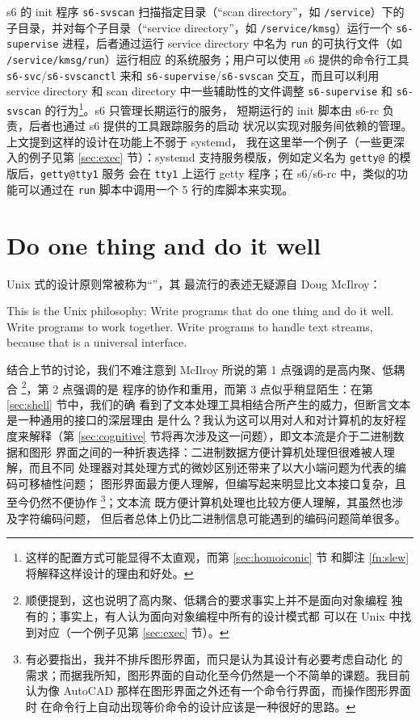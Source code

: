 s6 的 init 程序 \verb|s6-svscan| 扫描指定目录（“scan directory”，如
\verb|/service|）下的子目录，并对每个子目录（“service directory”，如
\verb|/service/kmsg|）运行一个 \verb|s6-supervise| 进程，后者通过运行 service
directory 中名为 \verb|run| 的可执行文件（如 \verb|/service/kmsg/run|）运行相应
的系统服务；用户可以使用 s6 提供的命令行工具 \verb|s6-svc|/\verb|s6-svscanctl|
来和 \verb|s6-supervise|/\verb|s6-svscan| 交互，而且可以利用 service directory
和 scan directory 中一些辅助性的文件调整 \verb|s6-supervise| 和 \verb|s6-svscan|
的行为\footnote{这样的配置方式可能显得不太直观，而第 \ref{sec:homoiconic} 节
和脚注 \ref{fn:slew} 将解释这样设计的理由和好处。}。s6 只管理长期运行的服务，
短期运行的 init 脚本由 s6-rc 负责，后者也通过 s6 提供的工具跟踪服务的启动
状况以实现对服务间依赖的管理。上文提到这样的设计在功能上不弱于 systemd，
我在这里举一个例子（一些更深入的例子见第 \ref{sec:exec} 节）：systemd
支持服务模版，例如定义名为 \verb|getty@| 的模版后，\verb|getty@tty1| 服务
会在 \verb|tty1| 上运行 getty 程序；在 s6/s6-rc 中，类似的功能可以通过在
\verb|run| 脚本中调用一个 5 行的库脚本来实现。

\section{Do one thing and do it well}\label{sec:mcilroy}

Unix 式的设计原则常被称为“”，其
最流行的表述无疑源自 Doug McIlroy：
\begin{quoting}
	This is the Unix philosophy:  Write programs that do one thing and
	do it well.  Write programs to work together.  Write programs to
	handle text streams, because that is a universal interface.
\end{quoting}

结合上节的讨论，我们不难注意到 McIlroy 所说的第 1 点强调的是高内聚、低耦合%
\footnote{顺便提到，这也说明了高内聚、低耦合的要求事实上并不是面向对象编程
独有的；事实上，有人认为面向对象编程中所有的设计模式都
可以在 Unix 中找到对应（一个例子见第 \ref{sec:exec} 节）。}，第 2 点强调的是
程序的协作和重用，而第 3 点似乎稍显陌生：在第 \ref{sec:shell} 节中，我们的确
看到了文本处理工具相结合所产生的威力，但断言文本是一种通用的接口的深层理由
是什么？我认为这可以用对人和对计算机的友好程度来解释（第
\ref{sec:cognitive} 节将再次涉及这一问题），即文本流是介于二进制数据和图形
界面之间的一种折衷选择：二进制数据方便计算机处理但很难被人理解，而且不同
处理器对其处理方式的微妙区别还带来了以大小端问题为代表的编码可移植性问题；
图形界面最方便人理解，但编写起来明显比文本接口复杂，且至今仍然不便协作%
\footnote{有必要指出，我并不排斥图形界面，而只是认为其设计有必要考虑自动化
的需求；而据我所知，图形界面的自动化至今仍然是一个不简单的课题。我目前
认为像 AutoCAD 那样在图形界面之外还有一个命令行界面，而操作图形界面时
在命令行上自动出现等价命令的设计应该是一种很好的思路。}；文本流
既方便计算机处理也比较方便人理解，其虽然也涉及字符编码问题，
但后者总体上仍比二进制信息可能遇到的编码问题简单很多。

